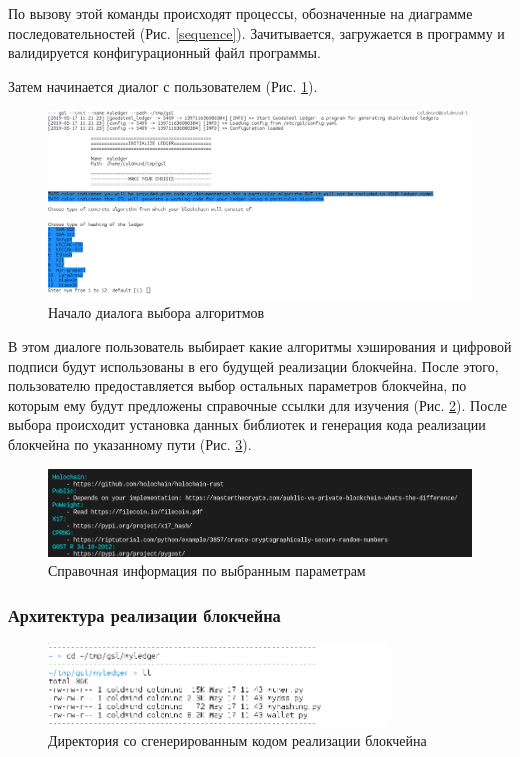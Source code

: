 По вызову этой команды происходят процессы, обозначенные на диаграмме
последовательностей (Рис. \ref{sequence}). Зачитывается, загружается в
программу и валидируется конфигурационный файл программы.

\newpage

Затем начинается диалог с пользователем (Рис. \ref{dialog}).
\begin{figure}[h]
    \centering
    \includegraphics[width=\textwidth]{images/dialog_start}
    \caption{Начало диалога выбора алгоритмов}\label{dialog}
\end{figure}

В этом диалоге пользователь выбирает какие алгоритмы хэширования и цифровой
подписи будут использованы в его будущей реализации блокчейна. После этого,
пользователю предоставляется выбор остальных параметров блокчейна, по которым ему
будут предложены справочные ссылки для изучения (Рис. \ref{sprav}).  После
выбора происходит установка данных библиотек и генерация кода реализации
блокчейна по указанному пути (Рис. \ref{ll}).

\begin{figure}[h]
    \centering
    \includegraphics[width=\textwidth]{images/spravochno}
    \caption{Справочная информация по выбранным параметрам}\label{sprav}
\end{figure}

\subsubsection{Архитектура реализации блокчейна}
\begin{figure}[h]
    \centering
    \includegraphics[width=0.8\textwidth]{images/ledger_ll}
    \caption{Директория со сгенерированным кодом реализации блокчейна}\label{ll}
\end{figure}

